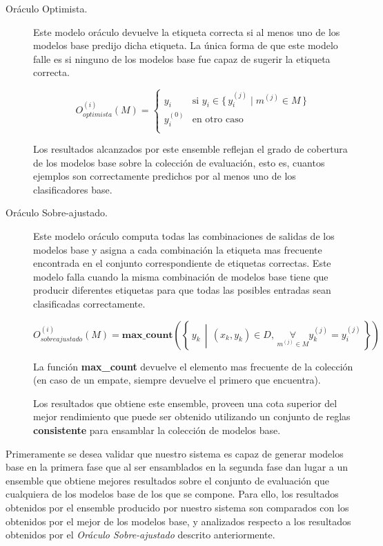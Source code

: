 \begin{description}

\item[Oráculo Optimista.]
Este modelo oráculo devuelve la etiqueta correcta si al menos uno de los modelos base predijo dicha etiqueta.
La única forma de que este modelo falle es si ninguno de los modelos base fue capaz de sugerir la etiqueta correcta.

\begin{equation*}
O_{optimista}^{(i)}(M) =
    \begin{cases}
        y_i & \textrm{si $y_i \in \{\,y^{(j)}_i \mid m^{(j)} \in M \,\}$} \\
        y^{(0)}_i & \textrm{en otro caso} \\
    \end{cases}
\end{equation*}

Los resultados alcanzados por este ensemble reflejan el grado de cobertura de los modelos base sobre la colección de evaluación, esto es, cuantos ejemplos son correctamente predichos por al menos uno de los clasificadores base.

\item[Oráculo Sobre-ajustado.]
Este modelo oráculo computa todas las combinaciones de salidas de los modelos base y asigna a cada combinación la etiqueta mas frecuente encontrada en el conjunto correspondiente de etiquetas correctas.
Este modelo falla cuando la misma combinación de modelos base tiene que producir diferentes etiquetas para que todas las posibles entradas sean clasificadas correctamente.

\begin{equation*}
O_{sobreajustado}^{(i)}(M) =
    \textbf{max\_count}\left(\left\{\, y_k \,\middle\vert\, (x_k, y_k) \in D, \, \underset{m^{(j)} \in M}{\forall} y^{(j)}_k = y^{(j)}_i \,\right\}\right)
\end{equation*}

La función \textbf{max\_count} devuelve el elemento mas frecuente de la colección (en caso de un empate, siempre devuelve el primero que encuentra).

Los resultados que obtiene este ensemble, proveen una cota superior del mejor rendimiento que puede ser obtenido utilizando un conjunto de reglas \textbf{consistente} para ensamblar la colección de modelos base.

\end{description}

Primeramente se desea validar que nuestro sistema es capaz de generar modelos base en la primera fase que al ser ensamblados en la segunda fase dan lugar a un ensemble que obtiene mejores resultados sobre el conjunto de evaluación que cualquiera de los modelos base de los que se compone.
Para ello, los resultados obtenidos por el ensemble producido por nuestro sistema son comparados con los obtenidos por el mejor de los modelos base, y analizados respecto a los resultados obtenidos por el \emph{Oráculo Sobre-ajustado} descrito anteriormente.

